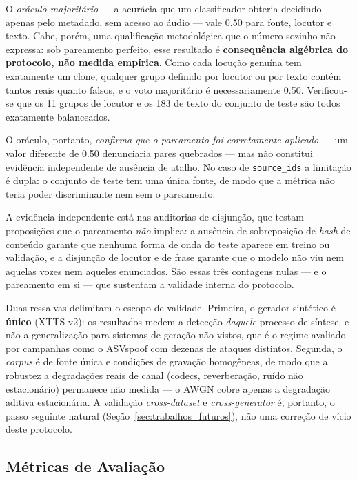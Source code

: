 \documentclass[12pt,a4paper]{article}
\begin{document}
O \emph{oráculo majoritário} --- a acurácia que um classificador obteria
decidindo apenas pelo metadado, sem acesso ao áudio --- vale \num{0,50} para
fonte, locutor e texto. Cabe, porém, uma qualificação metodológica que o
número sozinho não expressa: sob pareamento perfeito, esse resultado é
\textbf{consequência algébrica do protocolo, não medida empírica}. Como cada
locução genuína tem exatamente um clone, qualquer grupo definido por locutor ou
por texto contém tantos reais quanto falsos, e o voto majoritário é
necessariamente \num{0,50}. Verificou-se que os \num{11} grupos de locutor e os
\num{183} de texto do conjunto de teste são todos exatamente balanceados.

O oráculo, portanto, \emph{confirma que o pareamento foi corretamente
	aplicado} --- um valor diferente de \num{0,50} denunciaria pares quebrados ---
mas não constitui evidência independente de ausência de atalho. No caso de
\texttt{source\_ids} a limitação é dupla: o conjunto de teste tem uma única
fonte, de modo que a métrica não teria poder discriminante nem sem o
pareamento.

A evidência independente está nas auditorias de disjunção, que testam
proposições que o pareamento \emph{não} implica: a ausência de sobreposição de
\textit{hash} de conteúdo garante que nenhuma forma de onda do teste aparece em
treino ou validação, e a disjunção de locutor e de frase garante que o modelo
não viu nem aquelas vozes nem aqueles enunciados. São essas três contagens
nulas --- e o pareamento em si --- que sustentam a validade interna do
protocolo.

Duas ressalvas delimitam o escopo de validade. Primeira, o gerador sintético é
\textbf{único} (XTTS-v2): os resultados medem a detecção \emph{daquele} processo
de síntese, e não a generalização para sistemas de geração não vistos, que é o
regime avaliado por campanhas como o ASVspoof com dezenas de ataques distintos.
Segunda, o \textit{corpus} é de fonte única e condições de gravação homogêneas,
de modo que a robustez a degradações reais de canal (codecs, reverberação,
ruído não estacionário) permanece não medida --- o AWGN cobre apenas a
degradação aditiva estacionária. A validação \textit{cross-dataset} e
\textit{cross-generator} é, portanto, o passo seguinte natural
(Seção~\ref{sec:trabalhos_futuros}), não uma correção de vício deste protocolo.

\subsection{Métricas de Avaliação}
\label{sec:metricas}
\end{document}
